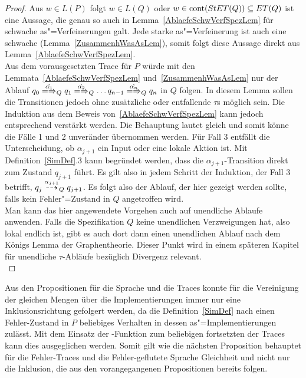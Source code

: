 \begin{proof}
  Aus $w\in L(P)$ folgt $w\in L(Q)$ oder $w\in\mathrm{cont} (StET (Q))\subseteq ET
  (Q)$ ist eine Aussage, die genau so auch in
  Lemma~\ref{AblaefeSchwVerfSpezLem} für schwache as"=Verfeinerungen galt. Jede
  starke as"=Verfeinerung ist auch eine schwache
  (Lemma~\ref{ZusammenhWasAsLem}), somit folgt diese Aussage direkt aus
  Lemma~\ref{AblaefeSchwVerfSpezLem}.\\
  Aus dem vorausgesetzten Trace für $P$ würde mit den
  Lemmata~\ref{AblaefeSchwVerfSpezLem} und~\ref{ZusammenhWasAsLem} nur der
  Ablauf $q_0 \weakmay[\hat{\alpha _1}]_Q q_1 \weakmay[\hat{\alpha _2}]_Q \dots
  q_{n-1} \weakmay[\hat{\alpha _n}]_Q q_n$ in $Q$ folgen. In diesem Lemma
  sollen die Transitionen jedoch ohne zusätzliche oder entfallende $\tau$s
  möglich sein. Die Induktion aus dem Beweis von~\ref{AblaefeSchwVerfSpezLem}
  kann jedoch entsprechend verstärkt werden. Die Behauptung lautet gleich und
  somit könne die Fälle 1 und 2 unveränder übernommen werden. Für Fall 3
  entfällt die Unterscheidung, ob $\alpha _{j+1}$ ein Input oder eine lokale
  Aktion ist. Mit Definition~\ref{SimDef}.3 kann begründet werden, dass die
  $\alpha _{j+1}$-Transition direkt zum Zustand $q_{j+1}$ führt. Es gilt also
  in jedem Schritt der Induktion, der Fall 3 betrifft, $q_j \may[\alpha
  _{j+1}]_Q q_{j+1}$. Es folgt also der Ablauf, der hier gezeigt werden sollte,
  falls kein Fehler"=Zustand in $Q$ angetroffen wird.\\
  Man kann das hier angewendete Vorgehen auch auf unendliche Ablaufe anwenden.
  Falls die Spezifikation $Q$ keine unendlichen Verzweigungen hat, also lokal
  endlich ist, gibt es auch dort dann einen unendlichen Ablauf nach dem Königs
  Lemma der Graphentheorie. Dieser Punkt wird in einem späteren Kapitel für
  unendliche $\tau$-Abläufe bezüglich Divergenz relevant.
  \\ 
\end{proof}

Aus den Propositionen für die Sprache und die Traces konnte für die Vereinigung
der gleichen Mengen über die Implementierungen immer nur eine
Inklusionsrichtung gefolgert werden, da die Definition~\ref{SimDef} nach einen
Fehler-Zustand in $P$ beliebiges Verhalten in dessen as"=Implementierungen
zulässt. Mit dem Einsatz der \cont{}-Funktion zum beliebigen fortsetzten der
Traces kann dies ausgeglichen werden. Somit gilt wie die nächsten Proposition
behauptet für die Fehler-Traces und die Fehler-geflutete Sprache Gleichheit
und nicht nur die Inklusion, die aus den vorangegangenen Propositionen bereits
folgen.

